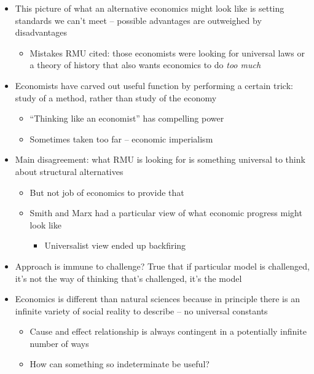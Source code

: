 \begin{itemize}
\tightlist
\item
  This picture of what an alternative economics might look like is
  setting standards we can't meet -- possible advantages are outweighed
  by disadvantages

  \begin{itemize}
  \tightlist
  \item
    Mistakes RMU cited: those economists were looking for universal laws
    or a theory of history that also wants economics to do
    \textit{too much}
  \end{itemize}
\item
  Economists have carved out useful function by performing a certain
  trick: study of a method, rather than study of the economy

  \begin{itemize}
  \tightlist
  \item
    ``Thinking like an economist'' has compelling power
  \item
    Sometimes taken too far -- economic imperialism
  \end{itemize}
\item
  Main disagreement: what RMU is looking for is something universal to
  think about structural alternatives

  \begin{itemize}
  \tightlist
  \item
    But not job of economics to provide that
  \item
    Smith and Marx had a particular view of what economic progress might
    look like

    \begin{itemize}
    \tightlist
    \item
      Universalist view ended up backfiring
    \end{itemize}
  \end{itemize}
\item
  Approach is immune to challenge? True that if particular model is
  challenged, it's not the way of thinking that's challenged, it's the
  model
\item
  Economics is different than natural sciences because in principle
  there is an infinite variety of social reality to describe -- no
  universal constants

  \begin{itemize}
  \tightlist
  \item
    Cause and effect relationship is always contingent in a potentially
    infinite number of ways
  \item
    How can something so indeterminate be useful?


\end{itemize}
\end{itemize}

